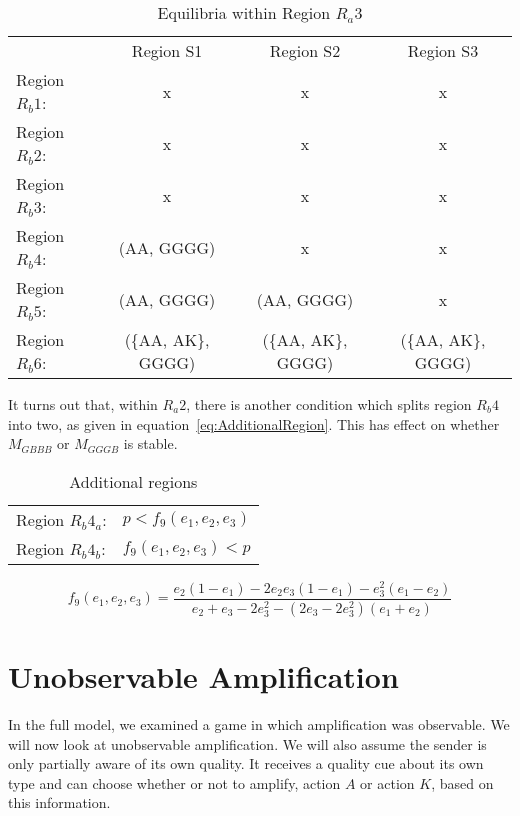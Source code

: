 \documentclass[a4paper,12pt]{article}
\numberwithin{equation}{section}
\begin{document}
\begin{table}[h]
\begin{center}
\begin{tabular}{lccc}
 & Region S1 & Region S2 & Region S3\\
Region $R_{b}1$: & x & x & x\\
Region $R_{b}2$: & x & x & x\\
Region $R_{b}3$: & x & x & x\\
Region $R_{b}4$: & (AA, GGGG) & x & x\\
Region $R_{b}5$: & (AA, GGGG) & (AA, GGGG) & x\\
Region $R_{b}6$: & (\{AA, AK\}, GGGG) & (\{AA, AK\}, GGGG) & (\{AA, AK\}, GGGG)
\end{tabular}
\end{center}
\caption{Equilibria within Region $R_{a}3$}
\label{tab:CueGamewithObservableAmplification/EquilibriaRa3}
\end{table}

It turns out that, within $R_{a}2$, there is another condition which splits region $R_{b}4$ into two, as given in equation~\ref{eq:AdditionalRegion}. This has effect on whether $M_{GBBB}$ or $M_{GGGB}$ is stable.

\begin{table}[h]
\begin{center}
\begin{tabular}{lc}
Region $R_{b}4_{a}$: & $p<f_{9}(e_{1}, e_{2}, e_{3})$\\
Region $R_{b}4_{b}$: & $f_{9}(e_{1}, e_{2}, e_{3})<p$
\end{tabular}
\end{center}
\caption{Additional regions}
\label{tab:CueGamewithObservableAmplification/AdditionalRegion}
\end{table}

\begin{equation}
\label{eq:AdditionalRegion}
f_{9}(e_{1}, e_{2}, e_{3})=\frac{e_{2}(1-e_{1})-2 e_{2} e_{3}(1-e_{1})-e_{3}^2 (e_{1}-e_{2})}{e_{2}+e_{3}-2 e_{3}^2-\left(2 e_{3}-2 e_{3}^2\right) (e_{1}+e_{2})}
\end{equation}

\newpage


\section{Unobservable Amplification}
\label{sec:Unobservable Amplification}

In the full model, we examined a game in which amplification was observable. We will now look at unobservable amplification. We will also assume the sender is only partially aware of its own quality. It receives a quality cue about its own type and can choose whether or not to amplify, action $A$ or action $K$, based on this information.
\end{document}
